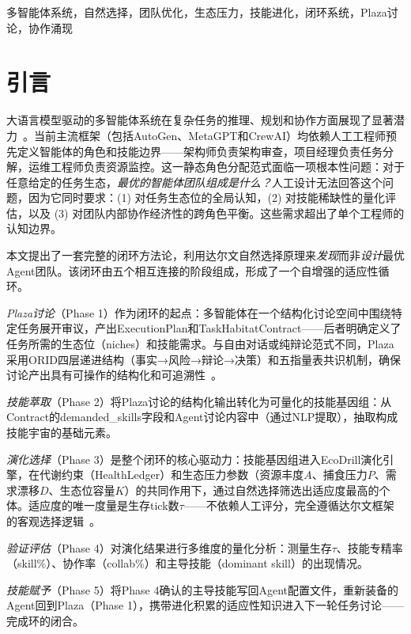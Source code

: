 \documentclass[conference]{IEEEtran}
\begin{document}
\begin{IEEEkeywords}
多智能体系统，自然选择，团队优化，生态压力，技能进化，闭环系统，Plaza讨论，协作涌现
\end{IEEEkeywords}

\section{引言}

大语言模型驱动的多智能体系统在复杂任务的推理、规划和协作方面展现了显著潜力~\cite{wu2023autogen,park2023generative,hong2023metagpt,shinn2023reflexion}。当前主流框架（包括AutoGen、MetaGPT和CrewAI）均依赖人工工程师预先定义智能体的角色和技能边界——架构师负责架构审查，项目经理负责任务分解，运维工程师负责资源监控。这一静态角色分配范式面临一项根本性问题：对于任意给定的任务生态，\emph{最优的智能体团队组成是什么？}人工设计无法回答这个问题，因为它同时要求：(1) 对任务生态位的全局认知，(2) 对技能稀缺性的量化评估，以及 (3) 对团队内部协作经济性的跨角色平衡。这些需求超出了单个工程师的认知边界。

本文提出了一套完整的闭环方法论，利用达尔文自然选择原理来\emph{发现}而非\emph{设计}最优Agent团队。该闭环由五个相互连接的阶段组成，形成了一个自增强的适应性循环。

\emph{Plaza讨论}（Phase 1）作为闭环的起点：多智能体在一个结构化讨论空间中围绕特定任务展开审议，产出ExecutionPlan和TaskHabitatContract——后者明确定义了任务所需的生态位（niches）和技能需求。与自由对话或纯辩论范式不同，Plaza采用ORID四层递进结构（事实→风险→辩论→决策）和五指量表共识机制，确保讨论产出具有可操作的结构化和可追溯性~\cite{kaner2014facilitator}。

\emph{技能萃取}（Phase 2）将Plaza讨论的结构化输出转化为可量化的技能基因组：从Contract的demanded\_skills字段和Agent讨论内容中（通过NLP提取），抽取构成技能宇宙的基础元素。

\emph{演化选择}（Phase 3）是整个闭环的核心驱动力：技能基因组进入EcoDrill演化引擎，在代谢约束（HealthLedger）和生态压力参数（资源丰度$A$、捕食压力$P$、需求漂移$D$、生态位容量$K$）的共同作用下，通过自然选择筛选出适应度最高的个体。适应度的唯一度量是生存tick数$\tau$——不依赖人工评分，完全遵循达尔文框架的客观选择逻辑~\cite{darwin1859,lenski2003evolutionary}。

\emph{验证评估}（Phase 4）对演化结果进行多维度的量化分析：测量生存$\tau$、技能专精率（skill\%）、协作率（collab\%）和主导技能（dominant skill）的出现情况。

\emph{技能赋予}（Phase 5）将Phase 4确认的主导技能写回Agent配置文件，重新装备的Agent回到Plaza（Phase 1），携带进化积累的适应性知识进入下一轮任务讨论——完成环的闭合。
\end{document}
